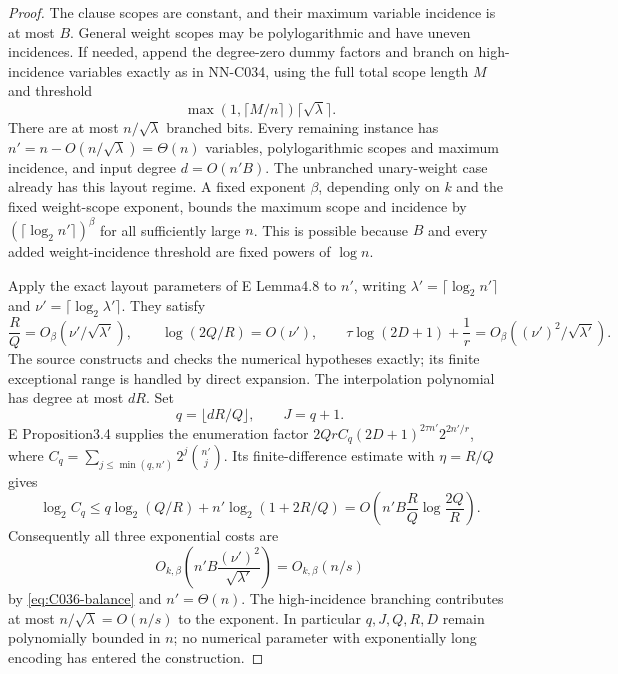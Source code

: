 \begin{proof}
The clause scopes are constant, and their maximum variable incidence is at most $B$. General weight scopes may be polylogarithmic and have uneven incidences. If needed, append the degree-zero dummy factors and branch on high-incidence variables exactly as in NN-C034, using the full total scope length $M$ and threshold
\[
                   \max(1,\lceil M/n\rceil)\lceil\sqrt\lambda\rceil.
\]
There are at most $n/\sqrt\lambda$ branched bits. Every remaining instance has $n'=n-O(n/\sqrt\lambda)=\Theta(n)$ variables, polylogarithmic scopes and maximum incidence, and input degree $d=O(n'B)$. The unbranched unary-weight case already has this layout regime. A fixed exponent $\beta$, depending only on $k$ and the fixed weight-scope exponent, bounds the maximum scope and incidence by $(\lceil\log_2n'\rceil)^\beta$ for all sufficiently large $n$. This is possible because $B$ and every added weight-incidence threshold are fixed powers of $\log n$.

Apply the exact layout parameters of E Lemma4.8 to $n'$, writing $\lambda'=\lceil\log_2n'\rceil$ and $\nu'=\lceil\log_2\lambda'\rceil$. They satisfy
\[
 \frac RQ=O_\beta(\nu'/\sqrt{\lambda'}),\qquad
 \log(2Q/R)=O(\nu'),\qquad
 \tau\log(2D+1)+\frac1r=O_\beta((\nu')^2/\sqrt{\lambda'}).
\]
The source constructs and checks the numerical hypotheses exactly; its finite exceptional range is handled by direct expansion. The interpolation polynomial has degree at most $dR$. Set
\[
                         q=\lfloor dR/Q\rfloor,\qquad J=q+1.
\]
E Proposition3.4 supplies the enumeration factor
$2QrC_q(2D+1)^{2\tau n'}2^{2n'/r}$, where
$C_q=\sum_{j\le\min(q,n')}2^j\binom{n'}j$.
Its finite-difference estimate with $\eta=R/Q$ gives
\[
 \log_2 C_q
   \le q\log_2(Q/R)+n'\log_2(1+2R/Q)
   =O\!\left(n'B\frac RQ\log\frac{2Q}{R}\right).
\]
Consequently all three exponential costs are
\[
           O_{k,\beta}\!\left(n'B\frac{(\nu')^2}{\sqrt{\lambda'}}\right)
                       =O_{k,\beta}(n/s)
\]
by \eqref{eq:C036-balance} and $n'=\Theta(n)$. The high-incidence branching contributes at most $n/\sqrt\lambda=O(n/s)$ to the exponent. In particular $q,J,Q,R,D$ remain polynomially bounded in $n$; no numerical parameter with exponentially long encoding has entered the construction.


\end{proof}
